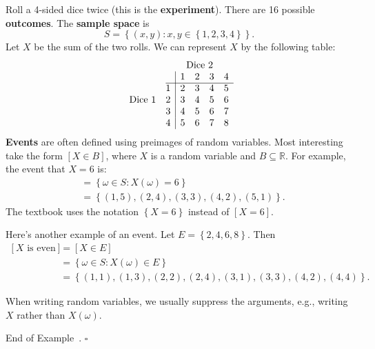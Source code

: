 \documentclass[10pt]{article}
\theoremstyle{definition}
\newtheorem{example}[theorem]{Example}
\renewenvironment{example}
{\begin{oldexample}}
  {\par\smallskip\hfill   End of Example~\theexample. $\square$    \par\end{oldexample}}
\newcommand{\1}[1]{\textbf{1}_{\left[#1\right]}} %
\def\R{\mathbb{R}} %
\begin{document}
\begin{example}[Sum 2d4]
  \label{ex:sum-2d4}
  Roll a 4-sided dice twice (this is the \textbf{experiment}). There are 16 possible
  \textbf{outcomes}. The \textbf{sample space} is
  \begin{equation*}
    S = \left\{(x,y): x,y\in \left\{1,2,3,4\right\} \right\}.
  \end{equation*}
  Let $X$ be the sum of the two rolls. We can represent $X$ by the following table:
  \begin{equation*}
    \begin{array}{c@{\quad}c|cccc} & \multicolumn{5}{c}{\text{Dice 2}} \\ & &
      1 & 2 & 3 & 4 \\ \cline{2-6}  & 1 & 2 & 3 & 4 & 5 \\ \text{Dice 1} & 2 & 3 & 4 & 5 & 6 \\ & 3 & 4 & 5 & 6 & 7 \\ & 4 & 5 & 6 & 7 & 8 \end{array}
  \end{equation*}
  \textbf{Events} are often defined using preimages of random variables. Most
  interesting take the form $[X\in B]$, where $X$ is a random variable and
  $B\subseteq \R$. For example, the event that $X=6$ is:
  \begin{align*}
    [X=6] 
    &= \left\{\omega\in S: X(\omega) = 6\right\} \\
    &= \left\{(1,5), (2,4), (3,3), (4,2), (5,1)\right\}.
  \end{align*}
  The textbook uses the notation $\left\{X=6\right\}$ instead of
  $\left[ X=6 \right]$.

  Here's another example of an event. Let $E = \left\{2,4,6,8\right\}$. Then
  \begin{align*}
    \left[ X \text{ is even} \right]
    &= \left[ X \in E \right]\\
    &= \left\{\omega\in S: X(\omega) \in E \right\} \\
    &= \left\{(1,1), (1,3), (2,2), (2,4), (3,1), (3,3), (4,2), (4,4) \right\}.
  \end{align*}

  When writing random variables, we usually suppress the arguments, e.g.,
  writing $X$ rather than $X(\omega)$.

  
\end{example}
\end{document}
